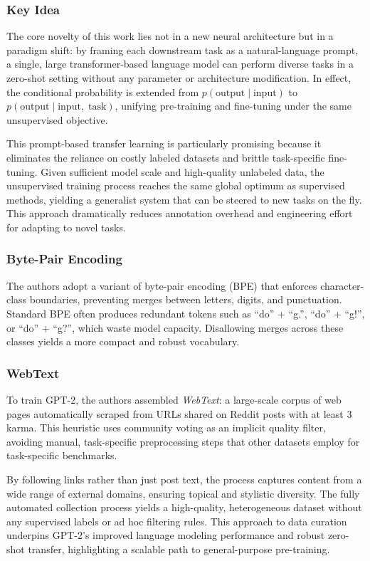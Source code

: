 \documentclass[10pt]{article}
\begin{document}
\subsubsection*{Key Idea}

The core novelty of this work lies not in a new neural architecture but in a paradigm shift: by framing each downstream task as a natural-language prompt, a single, large transformer-based language model can perform diverse tasks in a zero-shot setting without any parameter or architecture modification. In effect, the conditional probability is extended from \(p(\text{output}\mid \text{input})\) to \(p(\text{output}\mid \text{input},\;\text{task})\), unifying pre-training and fine-tuning under the same unsupervised objective.

This prompt-based transfer learning is particularly promising because it eliminates the reliance on costly labeled datasets and brittle task-specific fine-tuning. Given sufficient model scale and high-quality unlabeled data, the unsupervised training process reaches the same global optimum as supervised methods, yielding a generalist system that can be steered to new tasks on the fly. This approach dramatically reduces annotation overhead and engineering effort for adapting to novel tasks.

\subsubsection*{Byte-Pair Encoding}
The authors adopt a variant of byte-pair encoding (BPE) that enforces character-class boundaries, preventing merges between letters, digits, and punctuation. Standard BPE often produces redundant tokens such as “do” + “g.”, “do” + “g!”, or “do” + “g?”, which waste model capacity. Disallowing merges across these classes yields a more compact and robust vocabulary.

\subsubsection*{WebText}
To train GPT-2, the authors assembled \textit{WebText}: a large-scale corpus of web pages automatically scraped from URLs shared on Reddit posts with at least 3 karma. This heuristic uses community voting as an implicit quality filter, avoiding manual, task-specific preprocessing steps that other datasets employ for task-specific benchmarks.

By following links rather than just post text, the process captures content from a wide range of external domains, ensuring topical and stylistic diversity. The fully automated collection process yields a high-quality, heterogeneous dataset without any supervised labels or ad hoc filtering rules. This approach to data curation underpins GPT-2's improved language modeling performance and robust zero-shot transfer, highlighting a scalable path to general-purpose pre-training.
\end{document}
